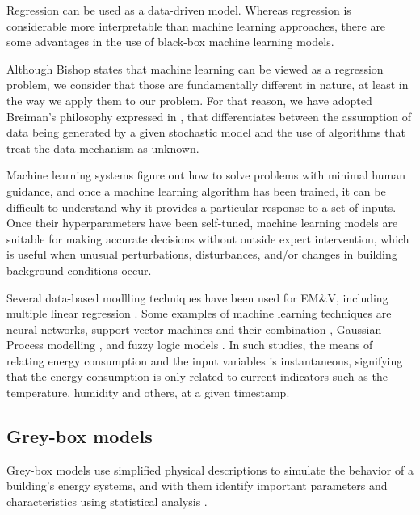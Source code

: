 \documentclass[10pt, conference, compsocconf]{IEEEtran}
\begin{document}
Regression can be used as a data-driven model. Whereas regression is considerable more interpretable than machine learning approaches, there are some advantages in the use of black-box machine learning models. 

Although Bishop \cite{bishop2006pattern} states that machine learning can be viewed as a regression problem, we consider that those are fundamentally different in nature, at least in the way we apply them to our problem. For that reason, we have adopted Breiman's philosophy expressed in \cite{breiman2001statistical}, that differentiates between the assumption of data being generated by a given stochastic model and the use of algorithms that treat the data mechanism as unknown.

Machine learning systems figure out how to solve problems with minimal human guidance, and once a machine learning algorithm has been trained, it can be difficult to understand why it provides a particular response to a set of inputs. 
Once their hyperparameters have been self-tuned, machine learning models are suitable for making accurate decisions without outside expert intervention, which is useful when unusual perturbations, disturbances, and/or changes in building background conditions occur. 

Several data-based modlling techniques have been used for EM\&V, including multiple linear regression \cite{braun2014using}.  %
Some examples of machine learning techniques are neural networks, support vector machines and their combination \cite{ahmad2014review}, Gaussian Process modelling \cite{heo2012gaussian}, and fuzzy logic models \cite{ciabattoni2014fuzzy}. In such studies, the means of relating energy consumption and the input variables is instantaneous, signifying that the energy consumption is only related to current indicators such as the temperature, humidity and others, at a given timestamp.
  

\subsection{Grey-box models}

Grey-box models use simplified physical descriptions to simulate the behavior of a building's energy systems, and with them identify important parameters and characteristics using statistical analysis \cite{handbook2017american}.
\end{document}
